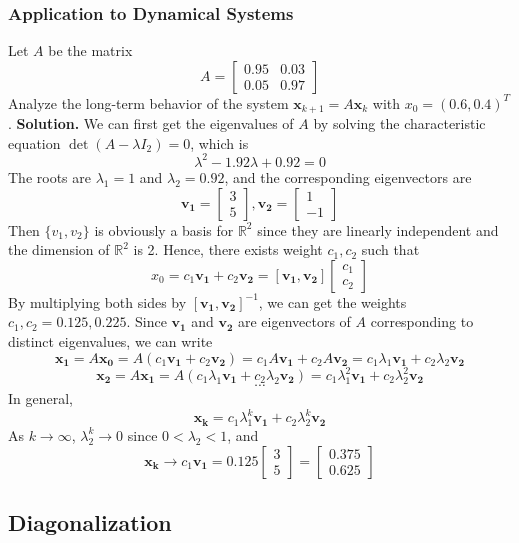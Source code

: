 \documentclass[10pt, a4paper]{article}
\newcommand{\R}{\mathbb{R}}
\newcommand{\vt}[1]{\mathbf{#1}}
\begin{document}
\subsubsection*{Application to Dynamical Systems}
\begin{example}
    Let $A$ be the matrix \[
    A = \begin{bmatrix}
        0.95 & 0.03\\
        0.05 & 0.97
    \end{bmatrix}
    \]
    Analyze the long-term behavior of the system $\vt{x}_{k+1}=A\vt{x}_k$ with $x_0=(0.6,0.4)^T$.
    \textbf{Solution.} 
    We can first get the eigenvalues of $A$ by solving the characteristic equation $\det(A-\lambda I_2)=0$, which is \[
    \lambda^2-1.92\lambda+0.92=0
    \]
    The roots are $\lambda_1=1$ and $\lambda_2=0.92$, and the corresponding eigenvectors are \[
    \vt{v_1}=\begin{bmatrix}
        3\\
        5
    \end{bmatrix}, \vt{v_2}=\begin{bmatrix}
        1\\
        -1
    \end{bmatrix}
    \]
    Then $\{v_1,v_2\}$ is obviously a basis for $\R^2$ since they are linearly independent and the dimension of $\R^2$ is 2.
    Hence, there exists weight $c_1,c_2$ such that \[
    x_0=c_1\vt{v_1}+c_2\vt{v_2} = [\vt{v_1},\vt{v_2}]\begin{bmatrix}
        c_1\\
        c_2
    \end{bmatrix}
    \]
    By multiplying both sides by $[\vt{v_1},\vt{v_2}]^{-1}$, we can get the weights $c_1,c_2 = 0.125, 0.225$.
    Since $\vt{v_1}$ and $\vt{v_2}$ are eigenvectors of $A$ corresponding to distinct eigenvalues, we can write \[
    \vt{x_1}=A\vt{x_0}=A(c_1\vt{v_1}+c_2\vt{v_2})=c_1A\vt{v_1}+c_2A\vt{v_2}=c_1\lambda_1\vt{v_1}+c_2\lambda_2\vt{v_2}
    \]
    \[
    \vt{x_2}=A\vt{x_1}=A(c_1\lambda_1\vt{v_1}+c_2\lambda_2\vt{v_2})=c_1\lambda_1^2\vt{v_1}+c_2\lambda_2^2\vt{v_2}
    \]
    \[\cdots\]
    In general, \[
    \vt{x_k}=c_1\lambda_1^k\vt{v_1}+c_2\lambda_2^k\vt{v_2}
    \]
    As $k\to \infty$, $\lambda_2^k\to 0$ since $0<\lambda_2<1$, and 
    \[
    \vt{x_k}\to c_1\vt{v_1} = 0.125\begin{bmatrix}
        3\\
        5
    \end{bmatrix}
    = \begin{bmatrix}
        0.375\\
        0.625
    \end{bmatrix}
    \]
\end{example}

\subsection{Diagonalization}
\end{document}
